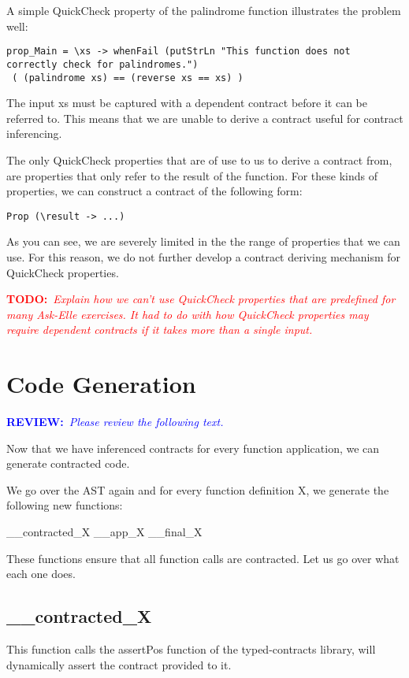 \documentclass[10pt]{report}
\newcommand{\annotate}[3]{
	\begin{scriptsize}
	\textcolor{#1}{\textbf{#2}~\textit{#3}}
	\end{scriptsize}\newline}
\newcommand{\todo}[1]{\annotate{red} {TODO:} {#1}}
\newcommand{\review}{\annotate{blue} {REVIEW:} {Please review the following text. \newline}}
\begin{document}
A simple QuickCheck property of the palindrome function illustrates the problem well:

\begin{lstlisting}
prop_Main = \xs -> whenFail (putStrLn "This function does not correctly check for palindromes.") 
 ( (palindrome xs) == (reverse xs == xs) )  
\end{lstlisting}

The input xs must be captured with a dependent contract before it can be referred to.
This means that we are unable to derive a contract useful for contract inferencing.

The only QuickCheck properties that are of use to us to derive a contract from, are properties that only refer to the result of the function.
For these kinds of properties, we can construct a contract of the following form:

\begin{lstlisting}
Prop (\result -> ...)
\end{lstlisting}

As you can see, we are severely limited in the the range of properties that we can use.
For this reason, we do not further develop a contract deriving mechanism for QuickCheck properties.
 
\todo {Explain how we can't use QuickCheck properties that are predefined for many Ask-Elle exercises. It had to do with how QuickCheck properties may require dependent contracts if it takes more than a single input.}

\section{Code Generation}
\label{codegeneration}

\review

Now that we have inferenced contracts for every function application, we can generate contracted code.

We go over the AST again and for every function definition X, we generate the following new functions:

\_\_contracted\_X
\_\_app\_X
\_\_final\_X

These functions ensure that all function calls are contracted. Let us go over what each one does.

\subsection{\_\_contracted\_X}
This function calls the assertPos function of the typed-contracts library, will dynamically assert the contract provided to it.
\end{document}
